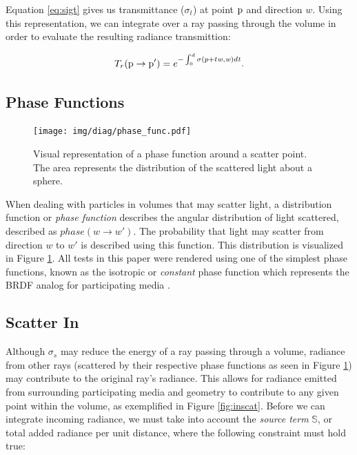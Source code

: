 \documentclass[12pt]{ucthesis}
\newcommand{\captionfonts}{\small\bf\ssp}
\begin{document}
Equation \ref{eq:sigt} gives us transmittance ($\sigma_{t}$) at point $\textup{p}$ and direction $w$.  Using this representation, we can integrate over a ray passing through the volume in order to evaluate the resulting radiance transmittion:

\begin{equation}
T_{r}(\textup{p} \to \textup{p}') = e^{-\int_{0}^{d}\sigma (p+t\mathit{w},\mathit{w})d\mathit{t}}.
\label{transmittion_eq}
\end{equation}

\subsection{Phase Functions}

\begin{figure}[h!]
    \centering
    \texttt{[image: img/diag/phase\_func.pdf]}
    \captionfonts
    \caption{Visual representation of a phase function around a scatter point.  The area represents the distribution of the scattered light about a sphere.}
    \label{fig:phase}
\end{figure}

When dealing with particles in volumes that may scatter light, a distribution function or \textit{phase function} describes the angular distribution of light scattered, described as $phase(w \to w')$.  The probability that light may scatter from direction $w$ to $w'$ is described using this function.  This distribution is visualized in Figure \ref{fig:phase}. All tests in this paper were rendered using one of the simplest phase functions, known as the isotropic or \textit{constant} phase function which represents the BRDF analog for participating media \cite{cerezo}.


\subsection{Scatter In}
Although $\sigma_{s}$ may reduce the energy of a ray passing through a volume, radiance from other rays (scattered by their respective phase functions as seen in Figure \ref{fig:phase}) may contribute to the original ray's radiance.  This allows for radiance emitted from surrounding participating media and geometry to contribute to any given point within the volume, as exemplified in Figure \ref{fig:inscat}.  Before we can integrate incoming radiance, we must take into account the \textit{source term} $\mathbb{S}$, or total added radiance per unit distance, where the following constraint must hold true:
\end{document}
